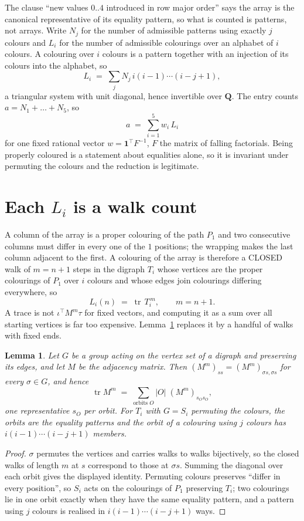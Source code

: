 \documentclass[11pt,a4paper]{article}
\theoremstyle{plain}
\newtheorem{lemma}[theorem]{Lemma}
\theoremstyle{definition}
\begin{document}
The clause ``new values $0..4$ introduced in row major order'' says the array is the
canonical representative of its equality pattern, so what is counted is patterns, not arrays.
Write $N_j$ for the number of admissible patterns using exactly $j$ colours and $L_i$ for the
number of admissible colourings over an alphabet of $i$ colours. A colouring over $i$ colours
is a pattern together with an injection of its colours into the alphabet, so
\[
L_i\;=\;\sum_j N_j\,i(i-1)\cdots(i-j+1),
\]
a triangular system with unit diagonal, hence invertible over $\mathbf{Q}$. The entry counts
$a=N_1+\dots+N_{5}$, so
\[
a\;=\;\sum_{i=1}^{5}w_i\,L_i
\]
for one fixed rational vector $w=\mathbf{1}^{\!\top}F^{-1}$, $F$ the matrix of falling
factorials. Being properly coloured is a statement about equalities alone, so it is invariant
under permuting the colours and the reduction is legitimate.

\section{Each $L_i$ is a walk count}

A column of the array is a proper colouring of the path $P_{1}$ and two consecutive
columns must differ in every one of the $1$ positions; the wrapping makes the last column
adjacent to the first. A colouring of the array is therefore a CLOSED walk of $m=n+1$ steps
in the digraph $T_i$ whose vertices are the proper colourings of $P_{1}$ over $i$ colours
and whose edges join colourings differing everywhere, so
\[
L_i(n)\;=\;\operatorname{tr}\,T_i^{\,m},\qquad m=n+1.
\]
A trace is not $\iota^{\!\top}M^m\tau$ for fixed vectors, and computing it as a sum over all
starting vertices is far too expensive. Lemma~\ref{lem:trace} replaces it by a handful of
walks with fixed ends.

\begin{lemma}\label{lem:trace}
Let $G$ be a group acting on the vertex set of a digraph and preserving its edges, and let $M$
be the adjacency matrix. Then $(M^m)_{ss}=(M^m)_{\sigma s,\sigma s}$ for every
$\sigma\in G$, and hence
\[
\operatorname{tr} M^m\;=\;\sum_{\text{orbits }O}|O|\;(M^m)_{s_O s_O} ,
\]
one representative $s_O$ per orbit. For $T_i$ with $G=S_i$ permuting the colours, the orbits
are the equality patterns and the orbit of a colouring using $j$ colours has
$i(i-1)\cdots(i-j+1)$ members.
\end{lemma}

\begin{proof}
$\sigma$ permutes the vertices and carries walks to walks bijectively, so the closed walks of
length $m$ at $s$ correspond to those at $\sigma s$. Summing the diagonal over each orbit
gives the displayed identity. Permuting colours preserves ``differ in every position'', so
$S_i$ acts on the colourings of $P_{1}$ preserving $T_i$; two colourings lie in one orbit
exactly when they have the same equality pattern, and a pattern using $j$ colours is realised
in $i(i-1)\cdots(i-j+1)$ ways.
\end{proof}
\end{document}
